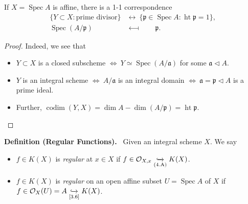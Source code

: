 \documentclass[11pt,a4paper,footinclude=true,headinclude=true]{scrbook} %
\DeclareMathOperator{\Spec}{Spec}
\DeclareMathOperator{\Ht}{ht}
\DeclareMathOperator{\codim}{codim}
\newcommand{\OO}{\mathcal{O}}
\newcommand{\pp}{\mathfrak{p}}
\newcommand{\<}{\langle}
\newcommand{\>}{\rangle}
\newenvironment{definition}[2][Definition]
    { \begin{mdframed}[backgroundcolor=gray!20] \textbf{#1 #2.}\ }
    {  \end{mdframed}}
\newenvironment{remark*}[2][Remark]
    { \begin{mdframed}[backgroundcolor=gray!20] \textbf{#1.}\ }
    {  \end{mdframed}}
\begin{document}
\begin{remark*}{}
    If $X=\Spec A$ is affine, there is a 1-1 correspondence
    \begin{align*}
        \{Y\subset X:\text{prime divisor}\} &\longleftrightarrow\ \{\pp\in\Spec A:\Ht\pp=1\},\\
        \Spec(A/\pp)\quad &\longmapsfrom\qquad\pp.
    \end{align*}
\end{remark*}
\begin{proof}
    Indeed, we see that
    \begin{itemize}
        \item $Y\subset X$ is a closed subscheme $\Leftrightarrow\ Y\simeq\Spec(A/\mathfrak{a})$ for some $\mathfrak{a}\triangleleft A$.
        \item $Y$ is an integral scheme $\Leftrightarrow\ A/\mathfrak{a}$ is an integral domain $\Leftrightarrow\ \mathfrak{a}=\pp\triangleleft A$ is a prime ideal.
        \item Further, $\codim(Y,X)=\dim A-\dim(A/\pp)=\Ht\pp$.
    \end{itemize}
\end{proof}

\begin{definition}{(Regular Functions)}
    Given an integral scheme $X$. We say
    \begin{itemize}
        \item $f\in K(X)$ is \textit{regular} at $x\in X$ if $f\in\OO_{X,x}\underset{\text{(4.A)}}{\xhookrightarrow{}}K(X)$.
        \item $f\in K(X)$ is \textit{regular} on an open affine subset $U=\Spec A$ of $X$ if $f\in\OO_X(U)=A\underset{\text{[3.6]}}{\xhookrightarrow{}}K(X)$.
    \end{itemize}
\end{definition}
\end{document}
